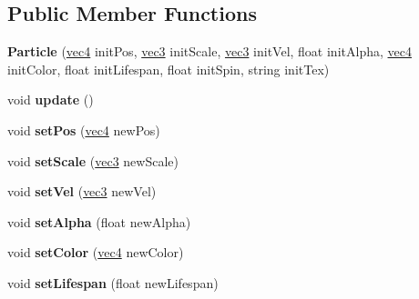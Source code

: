 \subsection*{Public Member Functions}
\begin{DoxyCompactItemize}
\item 
\hypertarget{class_particle_afcdc6f92de4e525a67617fe9fee6ae5d}{{\bfseries Particle} (\hyperlink{struct_angel_1_1vec4}{vec4} init\-Pos, \hyperlink{struct_angel_1_1vec3}{vec3} init\-Scale, \hyperlink{struct_angel_1_1vec3}{vec3} init\-Vel, float init\-Alpha, \hyperlink{struct_angel_1_1vec4}{vec4} init\-Color, float init\-Lifespan, float init\-Spin, string init\-Tex)}\label{class_particle_afcdc6f92de4e525a67617fe9fee6ae5d}

\item 
\hypertarget{class_particle_a686aad22bf7a80a089e117bbc7f4b738}{void {\bfseries update} ()}\label{class_particle_a686aad22bf7a80a089e117bbc7f4b738}

\item 
\hypertarget{class_particle_aabc36f29b35e0e1e5c6d6fb926bb7bbb}{void {\bfseries set\-Pos} (\hyperlink{struct_angel_1_1vec4}{vec4} new\-Pos)}\label{class_particle_aabc36f29b35e0e1e5c6d6fb926bb7bbb}

\item 
\hypertarget{class_particle_a1cdeee73a5eb04f48c0002f7136852ff}{void {\bfseries set\-Scale} (\hyperlink{struct_angel_1_1vec3}{vec3} new\-Scale)}\label{class_particle_a1cdeee73a5eb04f48c0002f7136852ff}

\item 
\hypertarget{class_particle_ac77b501936d44053585151c83b66ba22}{void {\bfseries set\-Vel} (\hyperlink{struct_angel_1_1vec3}{vec3} new\-Vel)}\label{class_particle_ac77b501936d44053585151c83b66ba22}

\item 
\hypertarget{class_particle_a3d339beee1c13eb3d1eed69d14715106}{void {\bfseries set\-Alpha} (float new\-Alpha)}\label{class_particle_a3d339beee1c13eb3d1eed69d14715106}

\item 
\hypertarget{class_particle_a8dbaf5f085a47c834c02f0531ccdbae1}{void {\bfseries set\-Color} (\hyperlink{struct_angel_1_1vec4}{vec4} new\-Color)}\label{class_particle_a8dbaf5f085a47c834c02f0531ccdbae1}

\item 
\hypertarget{class_particle_a2f59e88a58a6c6ea766ab4c94c75c2b3}{void {\bfseries set\-Lifespan} (float new\-Lifespan)}\label{class_particle_a2f59e88a58a6c6ea766ab4c94c75c2b3}


\end{DoxyCompactItemize}
